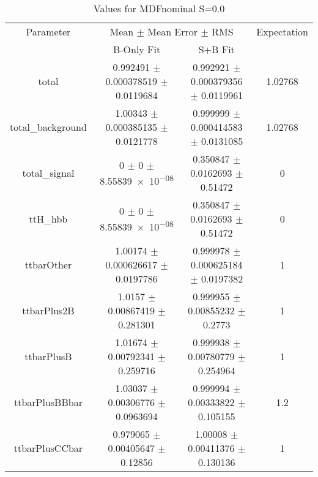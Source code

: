 \begin{table}
\centering
\caption{Values for MDFnominal S=0.0}
\begin{tabular}{cccc}
\toprule
Parameter & \multicolumn{2}{c}{Mean $\pm$ Mean Error $\pm$ RMS} & Expectation\\
 & B-Only Fit & S+B Fit & \\
\midrule
total & \num{0.992491} $\pm$ \num{0.000378519} $\pm$ \num{0.0119684} & \num{0.992921} $\pm$ \num{0.000379356} $\pm$ \num{0.0119961} & \num{1.02768}\\
total\_background & \num{1.00343} $\pm$ \num{0.000385135} $\pm$ \num{0.0121778} & \num{0.999999} $\pm$ \num{0.000414583} $\pm$ \num{0.0131085} & \num{1.02768}\\
total\_signal & \num{0} $\pm$ \num{0} $\pm$ \num{8.55839e-08} & \num{0.350847} $\pm$ \num{0.0162693} $\pm$ \num{0.51472} & \num{0}\\
ttH\_hbb & \num{0} $\pm$ \num{0} $\pm$ \num{8.55839e-08} & \num{0.350847} $\pm$ \num{0.0162693} $\pm$ \num{0.51472} & \num{0}\\
ttbarOther & \num{1.00174} $\pm$ \num{0.000626617} $\pm$ \num{0.0197786} & \num{0.999978} $\pm$ \num{0.000625184} $\pm$ \num{0.0197382} & \num{1}\\
ttbarPlus2B & \num{1.0157} $\pm$ \num{0.00867419} $\pm$ \num{0.281301} & \num{0.999955} $\pm$ \num{0.00855232} $\pm$ \num{0.2773} & \num{1}\\
ttbarPlusB & \num{1.01674} $\pm$ \num{0.00792341} $\pm$ \num{0.259716} & \num{0.999938} $\pm$ \num{0.00780779} $\pm$ \num{0.254964} & \num{1}\\
ttbarPlusBBbar & \num{1.03037} $\pm$ \num{0.00306776} $\pm$ \num{0.0963694} & \num{0.999994} $\pm$ \num{0.00333822} $\pm$ \num{0.105155} & \num{1.2}\\
ttbarPlusCCbar & \num{0.979065} $\pm$ \num{0.00405647} $\pm$ \num{0.12856} & \num{1.00008} $\pm$ \num{0.00411376} $\pm$ \num{0.130136} & \num{1}\\
\bottomrule
\end{tabular}
\end{table}
